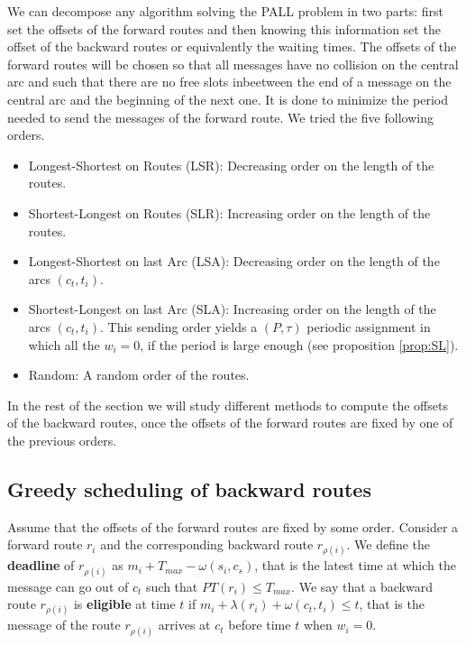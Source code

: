 \documentclass[a4paper,10pt]{article}
\begin{document}
     We can decompose any algorithm solving the PALL problem in two parts: first set the offsets of the forward routes and then knowing this information set the offset of the backward routes or equivalently the waiting times.  
     The offsets of the forward routes will be chosen so that all messages have no collision on the central arc and such that there are no free slots inbeetween the end of a message on the central arc and the beginning of the next one. 
     It is done to minimize the period needed to send the messages of the forward route.
     We tried the five following orders. 
	\begin{itemize}
	 
	 \item Longest-Shortest on Routes (LSR): Decreasing order on the length of the routes.
	 \item Shortest-Longest on Routes (SLR): Increasing order on the length of the routes. 
	 \item Longest-Shortest on last Arc (LSA): Decreasing order on the length of the arcs $(c_t,t_i)$.
	 \item Shortest-Longest on last Arc (SLA): Increasing order on the length of the arcs $(c_t,t_i)$. This sending order yields a $(P,\tau)$ periodic assignment in which all the $w_i = 0$, if the period is large enough (see proposition \ref{prop:SL}).
	 \item Random: A random order of the routes.
	\end{itemize}

   In the rest of the section we will study different methods to compute the offsets of the backward routes, once
   the offsets of the forward routes are fixed by one of the previous orders.
   
   \subsection{Greedy scheduling of backward routes}
    
    Assume that the offsets of the forward routes are fixed by some order. 
    Consider a forward route $r_i$ and the corresponding backward route $r_{\rho(i)}$.
    We define the {\bf deadline} of $r_{\rho(i)}$ as $m_{i} + T_{max} - \omega(s_i,c_s)$, that is the latest time at which the message can go out of $c_t$ such that $PT(r_i) \leq T_{max}$.
    We say that a backward route $r_{\rho(i)}$ is {\bf eligible} at time $t$ if $m_{i} +  \lambda(r_i) + \omega(c_t,t_i) \leq t$, that is the message of the route $r_{\rho(i)}$ arrives at $c_t$ before time $t$ when $w_i = 0$.
    
\end{document}
